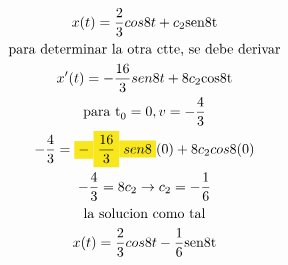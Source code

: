 \documentclass{article}
\begin{document}
\begin{gather*}
x(t) = \frac{2}{3}cos8t+c_{2}\text{sen8t} \\
\text{para determinar la otra ctte, se debe derivar} \\
x'(t) = -\frac{16}{3}sen8t+8c_{2}\text{cos8t} \\
\text{para t}_{0} =0, v =-\frac{4}{3} \\
-\frac{4}{3} = \text{\colorbox[RGB]{248,231,28}{$-$}}\text{\colorbox[RGB]{248,231,28}{$\frac{16}{3}$}}\text{\colorbox[RGB]{248,231,28}{$sen8$}}(0)+8c_{2}cos8(0) \\
-\frac{4}{3} =8c_{2}  \rightarrow  c_{2}=-\frac{1}{6} \\
\text{la solucion como tal} \\
x(t) = \frac{2}{3}cos8t-\frac{1}{6}\text{sen8t}
\end{gather*}
\end{document}
